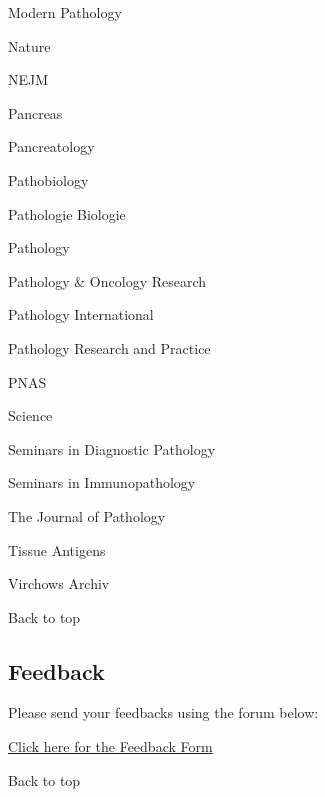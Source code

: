 \documentclass[]{article}
\begin{document}
Modern Pathology

Nature

NEJM

Pancreas

Pancreatology

Pathobiology

Pathologie Biologie

Pathology

Pathology \& Oncology Research

Pathology International

Pathology Research and Practice

PNAS

Science

Seminars in Diagnostic Pathology

Seminars in Immunopathology

The Journal of Pathology

Tissue Antigens

Virchows Archiv

Back to top

\pagebreak

\hypertarget{feedback}{%
\subsection{Feedback}\label{feedback}}

Please send your feedbacks using the forum below:

\href{https://docs.google.com/forms/d/e/1FAIpQLSeD3Z9J6Y7eMmiyM12f_SfAmHUlykb1zxZcwO6lg7cebGYQIQ/viewform}{Click
here for the Feedback Form}

Back to top
\end{document}
